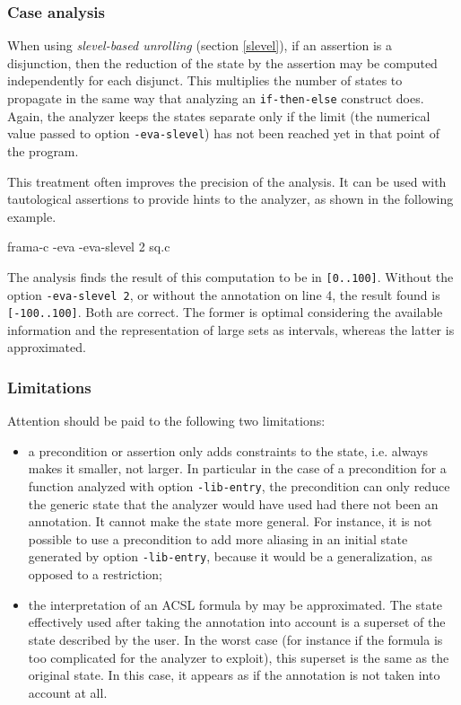 \documentclass{frama-c-book}
\begin{document}
\subsubsection{Case analysis}

When using {\em slevel-based unrolling} (section \ref{slevel}), if an
assertion is a disjunction, then the reduction of the state by the
assertion may be computed independently for each disjunct.  This
multiplies the number of states to propagate in the same way that
analyzing an \lstinline|if-then-else| construct does.  Again, the
analyzer keeps the states separate only if the limit (the numerical
value passed to option \lstinline|-eva-slevel|) has not been reached yet
in that point of the program.

This treatment often improves the precision of the analysis. It can be used with tautological assertions
to provide hints to the analyzer, as shown in the following example.


\begin{frama-c-commands}
frama-c -eva -eva-slevel 2 sq.c
\end{frama-c-commands}

The analysis finds the result
of this computation to be in \lstinline|[0..100]|. Without the
option \lstinline|-eva-slevel 2|, or without the annotation on line 4,
the result found
is \lstinline|[-100..100]|. Both are correct. The former is
optimal considering the available information and the representation
of large sets as intervals, whereas the latter is approximated.

\subsubsection{Limitations}

Attention should be paid to the following two limitations:
\begin{itemize}
\item a precondition or assertion only adds constraints to the state, i.e. always
makes it smaller, not larger. In particular in the case of a precondition for
a function analyzed with option \lstinline|-lib-entry|, the precondition
can only
reduce the generic state that the analyzer would have used had there
not been an annotation. It cannot make the state more general. For instance,
it is not possible to use a precondition to add more aliasing in
an initial state generated by option \lstinline|-lib-entry|,
because it would be a generalization, as opposed to a restriction;
\item the interpretation of an ACSL formula by \Eva{} may be
approximated. The state effectively used after taking the annotation
into account is a superset of
the state described by the user. In the worst case (for instance if
the formula is too complicated for the analyzer to exploit), this superset
is the same as the original state. In this case,
it appears as if the annotation is
not taken into account at all.
\end{itemize}
\smallskip
\end{document}

